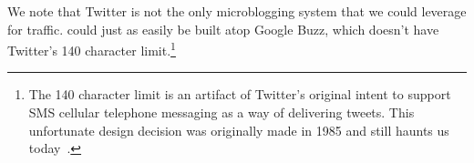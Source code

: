We note that Twitter is not the only microblogging system that we could
leverage for \hoot traffic. \hoot could just as easily be built atop
Google Buzz, which doesn't have Twitter's 140 character
limit.\footnote{The 140 character limit is an artifact of Twitter's
  original intent to support SMS cellular telephone messaging as a way
  of delivering tweets. This unfortunate design decision was originally
  made in 1985 and still haunts us today~\cite{latimes-char160}.}
